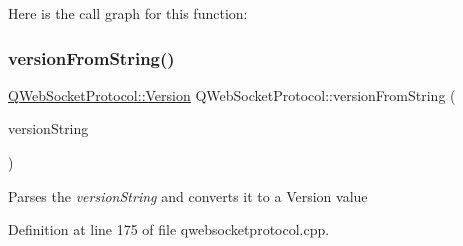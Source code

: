 Here is the call graph for this function\+:
\mbox{\label{namespace_q_web_socket_protocol_a9cb6b4d3ddbfacaccd73f4188da2bd5e}} 
\subsubsection{\texorpdfstring{version\+From\+String()}{versionFromString()}}
{\footnotesize\ttfamily \mbox{\hyperlink{namespace_q_web_socket_protocol_ad53f2684577effe0a517eadb48714df3}{Q\+Web\+Socket\+Protocol\+::\+Version}} Q\+Web\+Socket\+Protocol\+::version\+From\+String (\begin{DoxyParamCaption}\item[{const Q\+String \&}]{version\+String }\end{DoxyParamCaption})}

Parses the {\itshape version\+String} and converts it to a Version value 

Definition at line 175 of file qwebsocketprotocol.\+cpp.

